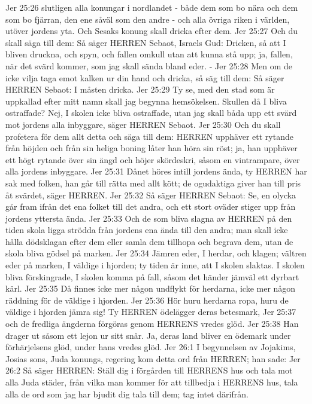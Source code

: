 Jer 25:26  slutligen alla konungar i nordlandet - både dem som bo nära och dem som bo fjärran, den ene såväl som den andre - och alla övriga riken i världen, utöver jordens yta. Och Sesaks konung skall dricka efter dem.
Jer 25:27  Och du skall säga till dem: Så säger HERREN Sebaot, Israels Gud: Dricken, så att I bliven druckna, och spyn, och fallen omkull utan att kunna stå upp; ja, fallen, när det svärd kommer, som jag skall sända bland eder. -
Jer 25:28  Men om de icke vilja taga emot kalken ur din hand och dricka, så säg till dem: Så säger HERREN Sebaot: I måsten dricka.
Jer 25:29  Ty se, med den stad som är uppkallad efter mitt namn skall jag begynna hemsökelsen. Skullen då I bliva ostraffade? Nej, I skolen icke bliva ostraffade, utan jag skall båda upp ett svärd mot jordens alla inbyggare, säger HERREN Sebaot.
Jer 25:30  Och du skall profetera för dem allt detta och säga till dem: HERREN upphäver ett rytande från höjden och från sin heliga boning låter han höra sin röst; ja, han upphäver ett högt rytande över sin ängd och höjer skördeskri, såsom en vintrampare, över alla jordens inbyggare.
Jer 25:31  Dånet höres intill jordens ända, ty HERREN har sak med folken, han går till rätta med allt kött; de ogudaktiga giver han till pris åt svärdet, säger HERREN.
Jer 25:32  Så säger HERREN Sebaot: Se, en olycka går fram ifrån det ena folket till det andra, och ett stort oväder stiger upp från jordens yttersta ända.
Jer 25:33  Och de som bliva slagna av HERREN på den tiden skola ligga strödda från jordens ena ända till den andra; man skall icke hålla dödsklagan efter dem eller samla dem tillhopa och begrava dem, utan de skola bliva gödsel på marken.
Jer 25:34  Jämren eder, I herdar, och klagen; vältren eder på marken, I väldige i hjorden; ty tiden är inne, att I skolen slaktas. I skolen bliva förskingrade, I skolen komma på fall, såsom det händer jämväl ett dyrbart kärl.
Jer 25:35  Då finnes icke mer någon undflykt för herdarna, icke mer någon räddning för de väldige i hjorden.
Jer 25:36  Hör huru herdarna ropa, huru de väldige i hjorden jämra sig! Ty HERREN ödelägger deras betesmark,
Jer 25:37  och de fredliga ängderna förgöras genom HERRENS vredes glöd.
Jer 25:38  Han drager ut såsom ett lejon ur sitt snår. Ja, deras land bliver en ödemark under förhärjelsens glöd, under hans vredes glöd.
Jer 26:1  I begynnelsen av Jojakims, Josias sons, Juda konungs, regering kom detta ord från HERREN; han sade:
Jer 26:2  Så säger HERREN: Ställ dig i förgården till HERRENS hus och tala mot alla Juda städer, från vilka man kommer för att tillbedja i HERRENS hus, tala alla de ord som jag har bjudit dig tala till dem; tag intet därifrån.
